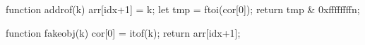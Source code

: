function addrof(k) {
    arr[idx+1] = k;
    let tmp = ftoi(cor[0]);
    return tmp & 0xffffffffn;
}

function fakeobj(k) {
    cor[0] = itof(k);
    return arr[idx+1];
}